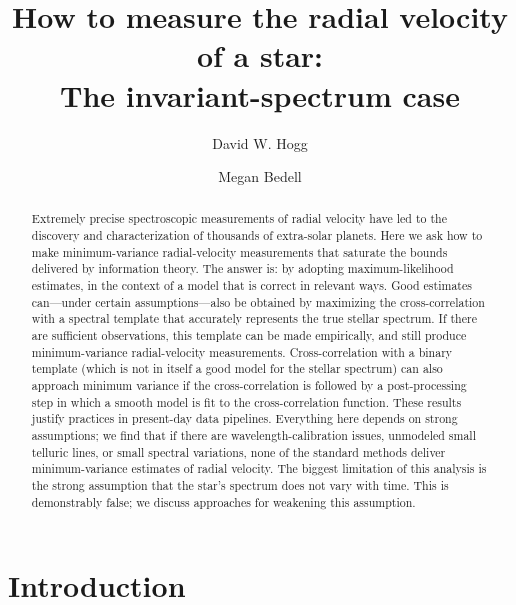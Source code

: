 \documentclass[modern]{aastex631}
\begin{document}
\title{How to measure the radial velocity of a star:\\The invariant-spectrum case}
\author[0000-0003-2866-9403]{David W. Hogg}

\author[0000-0001-9907-7742]{Megan Bedell}

\begin{abstract}\noindent
    Extremely precise spectroscopic measurements of radial velocity have led to the discovery and characterization of thousands of extra-solar planets.
    Here we ask how to make minimum-variance radial-velocity measurements that saturate the bounds delivered by information theory.
    The answer is: by adopting maximum-likelihood estimates, in the context of a model that is correct in relevant ways.
    Good estimates can---under certain assumptions---also be obtained by maximizing the cross-correlation with a spectral template that accurately represents the true stellar spectrum.
    If there are sufficient observations, this template can be made empirically, and still produce minimum-variance radial-velocity measurements.
    Cross-correlation with a binary template (which is not in itself a good model for the stellar spectrum) can also approach minimum variance if the cross-correlation is followed by a post-processing step in which a smooth model is fit to the cross-correlation function.
    These results justify practices in present-day data pipelines.
    Everything here depends on strong assumptions; we find that if there are wavelength-calibration issues, unmodeled small telluric lines, or small spectral variations, none of the standard methods deliver minimum-variance estimates of radial velocity.
    The biggest limitation of this analysis is the strong assumption that the star's spectrum does not vary with time.
    This is demonstrably false; we discuss approaches for weakening this assumption.
\end{abstract}


\section{Introduction}\label{sec:intro}
\end{document}
